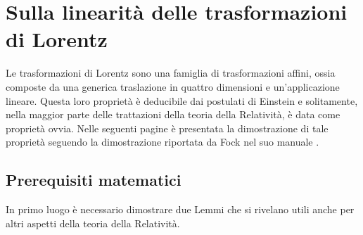 \chapter{Sulla linearità delle trasformazioni di Lorentz}
Le trasformazioni di Lorentz sono una famiglia di trasformazioni affini, ossia composte 
da una generica traslazione in quattro dimensioni e un'applicazione lineare. 
Questa loro proprietà è deducibile dai postulati di Einstein e solitamente, nella maggior 
parte delle trattazioni della teoria della Relatività, è data come proprietà ovvia. 
Nelle seguenti pagine è presentata la dimostrazione di tale proprietà seguendo la dimostrazione 
riportata da Fock nel suo manuale \cite{Fock}.\\

\section{Prerequisiti matematici}
In primo luogo è necessario dimostrare due Lemmi che si rivelano utili anche per altri 
aspetti della teoria della Relatività.

